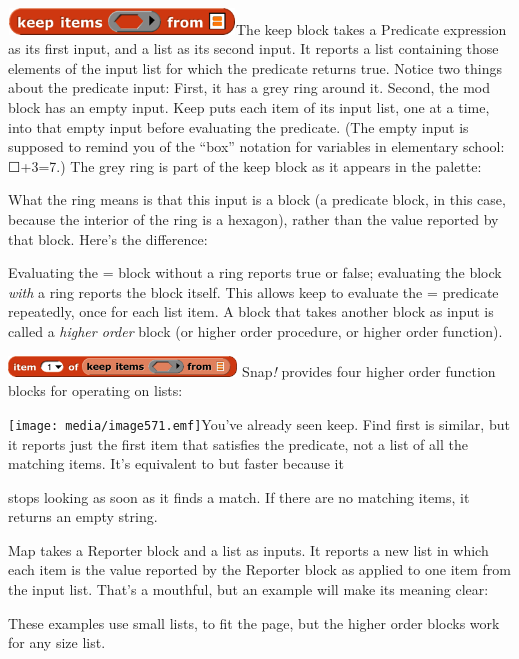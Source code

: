\includegraphics[width=2.375in,height=0.27778in]{media/image557.png}The
keep block takes a Predicate expression as its first input, and a list
as its second input. It reports a list containing those elements of the
input list for which the predicate returns true. Notice two things about
the predicate input: First, it has a grey ring around it. Second, the
mod block has an empty input. Keep puts each item of its input list, one
at a time, into that empty input before evaluating the predicate. (The
empty input is supposed to remind you of the ``box'' notation for
variables in elementary school: ☐+3=7.) The grey ring is part of the
keep block as it appears in the palette:

What the ring means is that this input is a block (a predicate block, in
this case, because the interior of the ring is a hexagon), rather than
the value reported by that block. Here's the difference:

Evaluating the = block without a ring reports true or false; evaluating
the block \emph{with} a ring reports the block itself. This allows keep
to evaluate the = predicate repeatedly, once for each list item. A block
that takes another block as input is called a \emph{higher order} block
(or higher order procedure, or higher order function).

\includegraphics[width=2.39in,height=0.22in]{media/image562.png}
Snap\emph{!} provides four higher order function blocks for operating on
lists:

\texttt{[image: media/image571.emf]}\label{map}{}You've
already seen keep. Find first is similar, but it reports just the first
item that satisfies the predicate, not a list of all the matching items.
It's equivalent to but faster because it

stops looking as soon as it finds a match. If there are no matching
items, it returns an empty string.

Map takes a Reporter block and a list as inputs. It reports a new list
in which each item is the value reported by the Reporter block as
applied to one item from the input list. That's a mouthful, but an
example will make its meaning clear:

These examples use small lists, to fit the page, but the higher order
blocks work for any size list.

